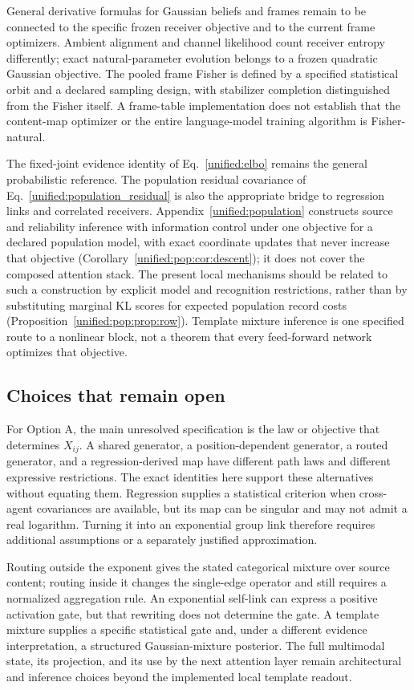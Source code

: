 \documentclass[11pt]{article}
\theoremstyle{definition}
\theoremstyle{remark}
\begin{document}
General derivative formulas for Gaussian beliefs and frames remain to be connected to the specific frozen receiver objective and to the current frame optimizers. Ambient alignment and channel likelihood count receiver entropy differently; exact natural-parameter evolution belongs to a frozen quadratic Gaussian objective. The pooled frame Fisher is defined by a specified statistical orbit and a declared sampling design, with stabilizer completion distinguished from the Fisher itself. A frame-table implementation does not establish that the content-map optimizer or the entire language-model training algorithm is Fisher-natural.

The fixed-joint evidence identity of Eq.~\eqref{unified:elbo} remains the general probabilistic reference. The population residual covariance of Eq.~\eqref{unified:population_residual} is also the appropriate bridge to regression links and correlated receivers. Appendix~\ref{unified:population} constructs source and reliability inference with information control under one objective for a declared population model, with exact coordinate updates that never increase that objective (Corollary~\ref{unified:pop:cor:descent}); it does not cover the composed attention stack. The present local mechanisms should be related to such a construction by explicit model and recognition restrictions, rather than by substituting marginal KL scores for expected population record costs (Proposition~\ref{unified:pop:prop:row}). Template mixture inference is one specified route to a nonlinear block, not a theorem that every feed-forward network optimizes that objective.

\subsection{Choices that remain open}

For Option A, the main unresolved specification is the law or objective that determines $X_{ij}$. A shared generator, a position-dependent generator, a routed generator, and a regression-derived map have different path laws and different expressive restrictions. The exact identities here support these alternatives without equating them. Regression supplies a statistical criterion when cross-agent covariances are available, but its map can be singular and may not admit a real logarithm. Turning it into an exponential group link therefore requires additional assumptions or a separately justified approximation.

Routing outside the exponent gives the stated categorical mixture over source content; routing inside it changes the single-edge operator and still requires a normalized aggregation rule. An exponential self-link can express a positive activation gate, but that rewriting does not determine the gate. A template mixture supplies a specific statistical gate and, under a different evidence interpretation, a structured Gaussian-mixture posterior. The full multimodal state, its projection, and its use by the next attention layer remain architectural and inference choices beyond the implemented local template readout.
\end{document}
